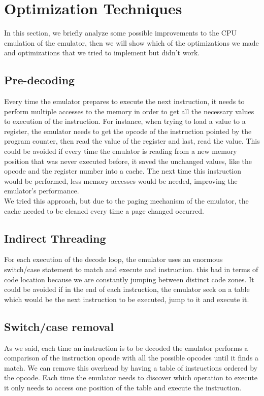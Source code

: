 \section{Optimization Techniques}
In this section, we briefly analyze some possible improvements to the CPU emulation of the emulator, then we will show which of the optimizations we made and optimizations that we tried to implement but didn't work.

\subsection{Pre-decoding}
Every time the emulator prepares to execute the next instruction, it needs to perform multiple accesses to the memory in order to get all the necessary values to execution of the instruction. For instance, when trying to load a value to a register, the emulator needs to get the opcode of the instruction pointed by the program counter, then read the value of the register and last, read the value. This could be avoided if every time the emulator is reading from a new memory position that was never executed before, it saved the unchanged values, like the opcode and the register number into a cache. The next time this instruction would be performed, less memory accesses would be needed, improving the emulator's performance.\\
\indent We tried this approach, but due to the paging mechanism of the emulator, the cache needed to be cleaned every time a page changed occurred.

\subsection{Indirect Threading}
For each execution of the decode loop, the emulator uses an enormous switch/case statement to match and execute and instruction. this bad in terms of code location because we are constantly jumping between distinct code zones. It could be avoided if in the end of each instruction, the emulator seek on a table which would be the next instruction to be executed, jump to it and execute it.

\subsection{Switch/case removal}
As we said, each time an instruction is to be decoded the emulator performs a comparison of the instruction opcode with all the possible opcodes until it finds a match. We can remove this overhead by having a table of instructions ordered by the opcode. Each time the emulator needs to discover which operation to execute it only needs to access one position of the table and execute the instruction.

